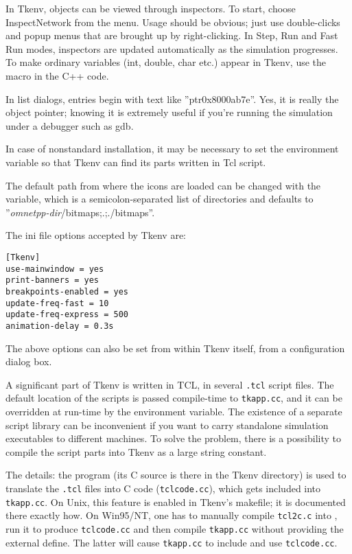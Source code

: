 

In Tkenv, objects can be viewed through inspectors. To start, choose
Inspect{\textbar}Network from the menu. Usage should be obvious; just
use double-clicks and popup menus that are brought up by
right-clicking. In Step, Run and Fast Run modes, inspectors are
updated automatically as the simulation progresses. To make ordinary
variables (int, double, char etc.) appear in Tkenv, use the
 macro in the C++ code.

In list dialogs, entries begin with text like ''ptr0x8000ab7e''. 
Yes, it is really the object pointer; knowing it is extremely 
useful if you're running the simulation under a debugger such 
as gdb.




In case of nonstandard installation, it may be necessary to set the
 environment variable so that Tkenv can find
its parts written in Tcl script.

\begin{sloppypar}
The default path from where the icons are loaded can be changed with
the  variable, which is a
semicolon-separated list of directories and defaults to
''\textit{omnetpp-dir}/bitmaps;.;./bitmaps''.
\end{sloppypar}

The ini file options accepted by Tkenv are:

\begin{Verbatim}
[Tkenv]
use-mainwindow = yes
print-banners = yes
breakpoints-enabled = yes
update-freq-fast = 10
update-freq-express = 500
animation-delay = 0.3s
\end{Verbatim}

The above options can also be set from within Tkenv itself, from 
a configuration dialog box.


A significant part of Tkenv is written in TCL, in several
\texttt{.tcl} script files. The default location of the scripts is
passed compile-time to \texttt{tkapp.cc}, and it can be overridden at
run-time by the  environment variable. The
existence of a separate script library can be inconvenient if you want
to carry standalone simulation executables to different machines. To
solve the problem, there is a possibility to compile the script parts
into Tkenv as a large string constant.

The details: the  program (its C source is there in the
Tkenv directory) is used to translate the \texttt{.tcl} files into C
code (\texttt{tclcode.cc}), which gets included into
\texttt{tkapp.cc}. On Unix, this feature is enabled in Tkenv's
makefile; it is documented there exactly how. On Win95/NT, one has to
manually compile \texttt{tcl2c.c} into , run it to
produce \texttt{tclcode.cc} and then compile \texttt{tkapp.cc} without
providing the  external define. The latter
will cause \texttt{tkapp.cc} to include and use \texttt{tclcode.cc}.




